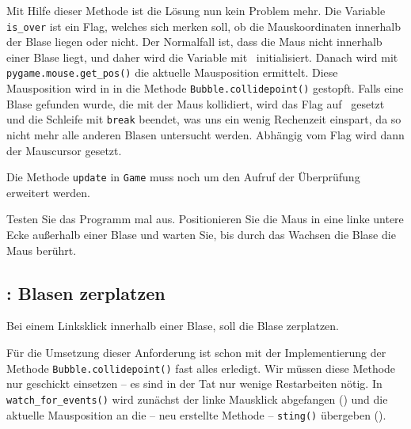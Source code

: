 
Mit Hilfe dieser Methode ist die Lösung nun kein Problem mehr. Die Variable \texttt{is\_over} ist ein Flag, welches sich merken soll, ob die Mauskoordinaten innerhalb der Blase liegen oder nicht. Der Normalfall ist, dass die Maus nicht innerhalb einer Blase liegt, und daher wird die Variable mit \false\ initialisiert. Danach wird mit \texttt{pygame.mouse.\-get\-\_pos()} die aktuelle Mausposition ermittelt. Diese Mausposition wird in  in die Methode \texttt{Bubble.collidepoint()} gestopft. Falls eine Blase gefunden wurde, die mit der Maus kollidiert, wird das Flag auf \true\ gesetzt und die Schleife mit \texttt{break} beendet, was uns ein wenig Rechenzeit einspart, da so nicht mehr alle anderen Blasen untersucht werden. Abhängig vom Flag wird dann der Mauscursor gesetzt.


Die Methode \texttt{update} in \texttt{Game} muss noch um den Aufruf der Überprüfung erweitert werden.


Testen Sie das Programm mal aus. Positionieren Sie die Maus in eine linke untere Ecke außerhalb einer Blase und warten Sie, bis durch das Wachsen die Blase die Maus berührt.

\subsection{: Blasen zerplatzen}
    Bei einem Linksklick innerhalb einer Blase, soll die Blase zerplatzen.
\er

Für die Umsetzung dieser Anforderung ist schon mit der Implementierung der Methode \texttt{Bubble.collidepoint()} fast alles erledigt. Wir müssen diese Methode nur geschickt einsetzen -- es sind in der Tat nur wenige Restarbeiten nötig. In \texttt{watch\_for\_events()} wird zunächst der linke Mausklick abgefangen () und die aktuelle Mausposition an die -- neu erstellte Methode -- \texttt{sting()} übergeben (). 

